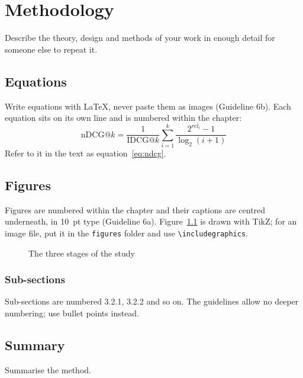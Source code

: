 \chapter{Methodology}
\label{ch:methodology}

Describe the theory, design and methods of your work in enough detail for someone else to
repeat it.

\section{Equations}
Write equations with LaTeX, never paste them as images (Guideline 6b). Each equation sits
on its own line and is numbered within the chapter:
\begin{equation}
  \mathrm{nDCG}@k = \frac{1}{\mathrm{IDCG}@k}\sum_{i=1}^{k}\frac{2^{rel_i}-1}{\log_2(i+1)}
  \label{eq:ndcg}
\end{equation}
Refer to it in the text as equation~\ref{eq:ndcg}.

\section{Figures}
Figures are numbered within the chapter and their captions are centred underneath, in
10~pt type (Guideline 6a). Figure~\ref{fig:pipeline} is drawn with TikZ; for an image file,
put it in the \texttt{figures} folder and use \verb|\includegraphics|.

\begin{figure}[htbp]
  \centering
  \caption{The three stages of the study}
  \label{fig:pipeline}
\end{figure}

\subsection{Sub-sections}
Sub-sections are numbered 3.2.1, 3.2.2 and so on. The guidelines allow no deeper
numbering; use bullet points instead.

\section{Summary}
Summarise the method.
